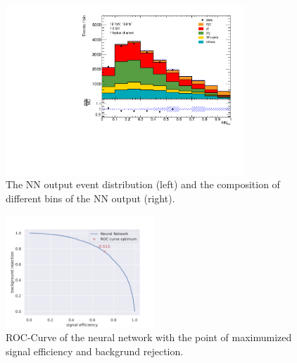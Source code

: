 \begin{figure}
    \centering
    \includegraphics[width=0.8\textwidth]{Plots/NN_out_mix_GANZ.pdf}
    \caption{The NN output event distribution (left) and the composition of different bins of the NN output (right).}
    \label{fig:NNdistro}
\end{figure}
\begin{figure}
    \centering
    \includegraphics[width=0.5\textwidth]{Plots/ROC-Curve-fullt.pdf}
    \caption{ROC-Curve of the neural network with the point of maximumized signal efficiency and backgrund rejection.}
    \label{fig:rocfull}
\end{figure}

